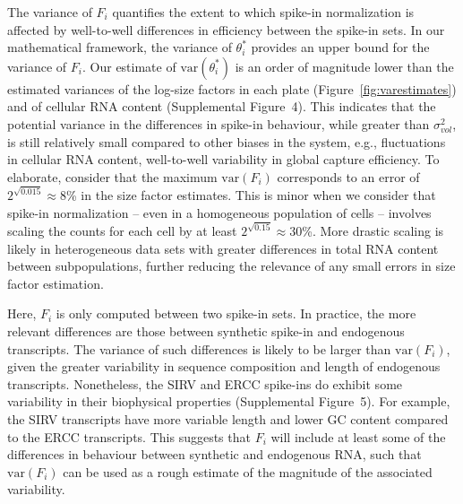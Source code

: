 \documentclass{article}
\newcommand{\suppfigcell}{4}
\newcommand{\suppfigbiophys}{5}
\newcommand\variance{\mbox{var}}
\begin{document}
The variance of $F_i$ quantifies the extent to which spike-in normalization is affected by well-to-well differences in efficiency between the spike-in sets.
In our mathematical framework, the variance of $\theta^*_i$ provides an upper bound for the variance of $F_i$.
Our estimate of $\variance(\theta^*_i)$ is an order of magnitude lower than the estimated variances of the log-size factors in each plate (Figure~\ref{fig:varestimates}) and of cellular RNA content (Supplemental Figure~\suppfigcell{}).
This indicates that the potential variance in the differences in spike-in behaviour, while greater than $\sigma^2_{vol}$, is still relatively small compared to other biases in the system, e.g., fluctuations in cellular RNA content, well-to-well variability in global capture efficiency.
To elaborate, consider that the maximum $\variance(F_i)$ corresponds to an error of $2^{\sqrt{0.015}} \approx 8$\% in the size factor estimates.
This is minor when we consider that spike-in normalization -- even in a homogeneous population of cells -- involves scaling the counts for each cell by at least $2^{\sqrt{0.15}} \approx 30$\%.
More drastic scaling is likely in heterogeneous data sets with greater differences in total RNA content between subpopulations, further reducing the relevance of any small errors in size factor estimation.

Here, $F_i$ is only computed between two spike-in sets.
In practice, the more relevant differences are those between synthetic spike-in and endogenous transcripts.
The variance of such differences is likely to be larger than $\variance(F_i)$, given the greater variability in sequence composition and length of endogenous transcripts.
Nonetheless, the SIRV and ERCC spike-ins do exhibit some variability in their biophysical properties (Supplemental Figure~\suppfigbiophys{}).
For example, the SIRV transcripts have more variable length and lower GC content compared to the ERCC transcripts.
This suggests that $F_i$ will include at least some of the differences in behaviour between synthetic and endogenous RNA, such that $\variance(F_i)$ can be used as a rough estimate of the magnitude of the associated variability.
\end{document}
